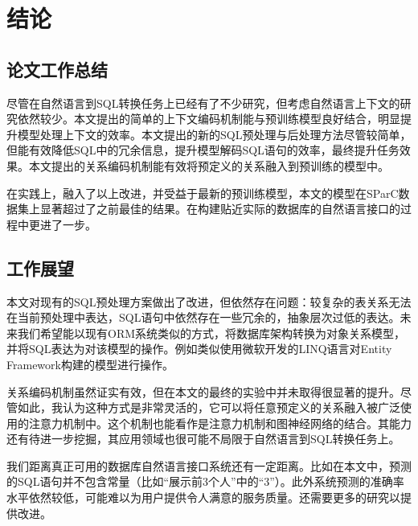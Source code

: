 \chapter{结论}

\section{论文工作总结}

尽管在自然语言到SQL转换任务上已经有了不少研究，但考虑自然语言上下文的研究依然较少。本文提出的简单的上下文编码机制能与预训练模型良好结合，明显提升模型处理上下文的效率。本文提出的新的SQL预处理与后处理方法尽管较简单，但能有效降低SQL中的冗余信息，提升模型解码SQL语句的效率，最终提升任务效果。本文提出的关系编码机制能有效将预定义的关系融入到预训练的模型中。

在实践上，融入了以上改进，并受益于最新的预训练模型，本文的模型在SParC数据集上显著超过了之前最佳的结果。在构建贴近实际的数据库的自然语言接口的过程中更进了一步。

\section{工作展望}

本文对现有的SQL预处理方案做出了改进，但依然存在问题：较复杂的表关系无法在当前预处理中表达，SQL语句中依然存在一些冗余的，抽象层次过低的表达。未来我们希望能以现有ORM系统类似的方式，将数据库架构转换为对象关系模型，并将SQL表达为对该模型的操作。例如类似使用微软开发的LINQ语言对Entity Framework构建的模型进行操作。

关系编码机制虽然证实有效，但在本文的最终的实验中并未取得很显著的提升。尽管如此，我认为这种方式是非常灵活的，它可以将任意预定义的关系融入被广泛使用的注意力机制中。这个机制也能看作是注意力机制和图神经网络的结合。其能力还有待进一步挖掘，其应用领域也很可能不局限于自然语言到SQL转换任务上。

我们距离真正可用的数据库自然语言接口系统还有一定距离。比如在本文中，预测的SQL语句并不包含常量（比如“展示前3个人”中的“3”）。此外系统预测的准确率水平依然较低，可能难以为用户提供令人满意的服务质量。还需要更多的研究以提供改进。
